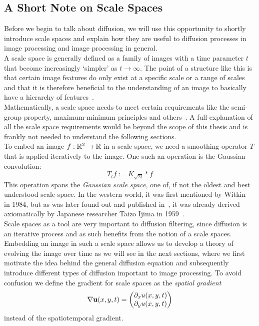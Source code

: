 \subsection{A Short Note on Scale Spaces}\label{sub:ScaleSpaces}
Before we begin to talk about diffusion, we will use this opportunity to shortly introduce scale
spaces and explain how they are useful to diffusion processes in image processing and image
processing in general.\\
A scale space is generally defined as a family of images with a time parameter $t$ that become
increasingly `simpler' as $t \to \infty$. The point of a structure like this is that certain image
features do only exist at a specific scale or a range of scales and that it is therefore beneficial
to the understanding of an image to basically have a hierarchy of features~\cite{lindeberg94}.\\
Mathematically, a scale
space needs to meet certain requirements like the semi-group property, maximum-minimum principles
and others~\cite{weickert96, alvarez93}.\newpage\noindent
A full explanation of all the scale space requirements would be beyond the scope of this thesis
and is frankly not needed to understand the following sections.\\
To embed an image $f:\mathbb{R}^2 \rightarrow \mathbb{R}$ in a scale space, we need a smoothing
operator $T$ that is applied iteratively to the image. One such an operation is the Gaussian
convolution: 
\begin{equation}
    T_{t}f := K_{\sqrt{2t}} * f
\end{equation}
This operation spans the \textit{Gaussian scale space}, one of, if not the oldest and best
understood scale space. In the western world, it was first mentioned by Witkin~\cite{witkin84} in 1984,
but as was later found out and published in~\cite{weickert-ishikawa}, it was already derived
axiomatically by Japanese researcher Taizo Ijima in 1959~\cite{ijima}. \\
Scale spaces as a tool are very important to diffusion filtering, since diffusion is an iterative
process and as such benefits from the notion of a scale spaces. Embedding an image in such a scale
space allows us to develop a theory of evolving the image over time as we will see in the next
sections, where we first motivate the idea behind the general diffusion equation and
subsequently introduce different types of diffusion important to image processing.
To avoid confusion we define the gradient for scale spaces as the \textit{spatial gradient} 
\begin{equation}
    \mathbf{\nabla} \mathbf{u}(x, y, t) = \begin{pmatrix}
        \partial_x u(x, y, t)\\
        \partial_y u(x, y, t)
    \end{pmatrix} 
\end{equation}
instead of the spatiotemporal gradient.

